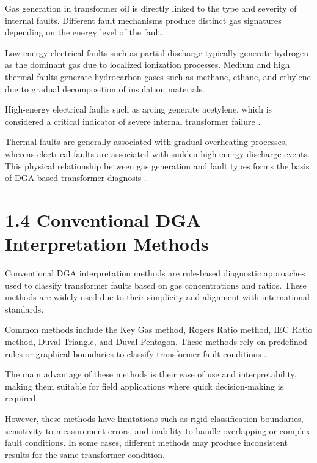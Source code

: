 Gas generation in transformer oil is directly linked to the type and severity of internal faults. Different fault mechanisms produce distinct gas signatures depending on the energy level of the fault.

Low-energy electrical faults such as partial discharge typically generate hydrogen as the dominant gas due to localized ionization processes. Medium and high thermal faults generate hydrocarbon gases such as methane, ethane, and ethylene due to gradual decomposition of insulation materials.

High-energy electrical faults such as arcing generate acetylene, which is considered a critical indicator of severe internal transformer failure \parencite{Dladla2025SLR}.

Thermal faults are generally associated with gradual overheating processes, whereas electrical faults are associated with sudden high-energy discharge events. This physical relationship between gas generation and fault types forms the basis of DGA-based transformer diagnosis \parencite{Cao2024Advancement}.

\section{1.4 Conventional DGA Interpretation Methods}

Conventional DGA interpretation methods are rule-based diagnostic approaches used to classify transformer faults based on gas concentrations and ratios. These methods are widely used due to their simplicity and alignment with international standards.

Common methods include the Key Gas method, Rogers Ratio method, IEC Ratio method, Duval Triangle, and Duval Pentagon. These methods rely on predefined rules or graphical boundaries to classify transformer fault conditions \parencite{Ali2023ConventionalDGA}.

The main advantage of these methods is their ease of use and interpretability, making them suitable for field applications where quick decision-making is required.

However, these methods have limitations such as rigid classification boundaries, sensitivity to measurement errors, and inability to handle overlapping or complex fault conditions. In some cases, different methods may produce inconsistent results for the same transformer condition.

